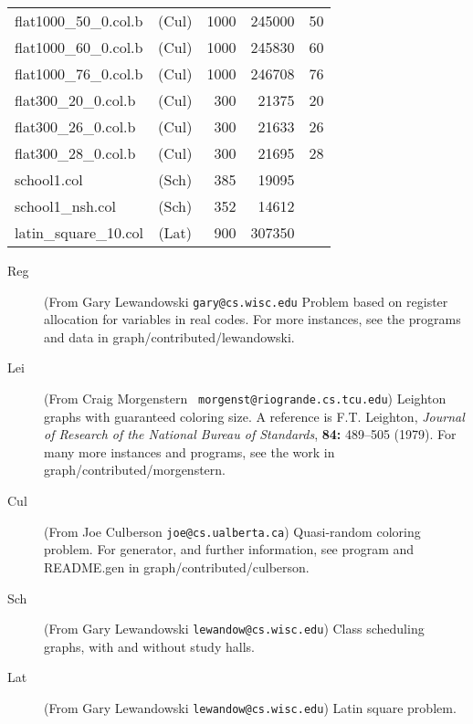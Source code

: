 \begin{supertabular}{|lc|rr|c|}
flat1000\_50\_0.col.b&(Cul)&1000&245000&50\\
flat1000\_60\_0.col.b&(Cul)&1000&245830&60\\
flat1000\_76\_0.col.b&(Cul)&1000&246708&76\\
flat300\_20\_0.col.b&(Cul)&300&21375&20\\
flat300\_26\_0.col.b&(Cul)&300&21633&26\\
flat300\_28\_0.col.b&(Cul)&300&21695&28\\
school1.col&(Sch)&385&19095& \\
school1\_nsh.col&(Sch)&352&14612& \\
latin\_square\_10.col&(Lat)&900&307350& \\
\end{supertabular}
\bigskip
{}
\begin{description}
\item[Reg] (From Gary Lewandowski {\tt gary@cs.wisc.edu} Problem based
on register allocation for variables in real codes.  For more
instances, see the programs and data in graph/contributed/lewandowski.

\item[Lei] (From Craig Morgenstern {\tt
morgenst@riogrande.cs.tcu.edu}) Leighton graphs with guaranteed
coloring size.  A reference is F.T. Leighton, {\it Journal of Research
of the National Bureau of Standards}, {\bf 84:} 489--505 (1979).  For
many more instances and programs, see the work in
graph/contributed/morgenstern.  

\item[Cul] (From Joe Culberson {\tt joe@cs.ualberta.ca}) Quasi-random
  coloring problem.  For generator, and further information, see
  program and README.gen in graph/contributed/culberson.

\item[Sch] (From Gary Lewandowski {\tt lewandow@cs.wisc.edu}) Class
  scheduling graphs, with and without study halls.

\item[Lat] (From Gary Lewandowski {\tt lewandow@cs.wisc.edu}) Latin
  square problem.
\end{description}


